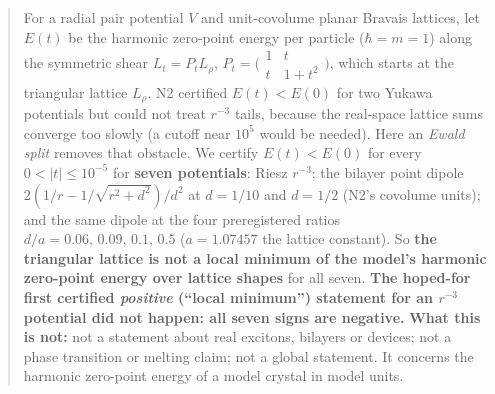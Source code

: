 \documentclass[11pt]{article}
\begin{document}
\begin{abstract}
For a radial pair potential $V$ and unit-covolume planar Bravais lattices, let $E(t)$ be the harmonic zero-point energy per particle ($\hbar=m=1$) along the symmetric shear
$L_t=P_tL_\rho$, $P_t=\bigl(\begin{smallmatrix}1&t\\t&1+t^2\end{smallmatrix}\bigr)$, which starts at the triangular lattice $L_\rho$.
N2 certified $E(t)<E(0)$ for two Yukawa potentials but could not treat $r^{-3}$ tails, because the real-space lattice sums converge too slowly (a cutoff near $10^5$ would be needed).
Here an \emph{Ewald split} removes that obstacle. We certify $E(t)<E(0)$ for every $0<|t|\le10^{-5}$ for \textbf{seven potentials}: Riesz $r^{-3}$; the bilayer point dipole
$2(1/r-1/\sqrt{r^2+d^2})/d^2$ at $d=1/10$ and $d=1/2$ (N2's covolume units); and the same dipole at the four preregistered ratios $d/a=0.06,\,0.09,\,0.1,\,0.5$ ($a=1.07457$ the lattice constant).
So \textbf{the triangular lattice is not a local minimum of the model's harmonic zero-point energy over lattice shapes} for all seven.
\textbf{The hoped-for first certified \emph{positive} (``local minimum'') statement for an $r^{-3}$ potential did not happen: all seven signs are negative.}
\textbf{What this is not:} not a statement about real excitons, bilayers or devices; not a phase transition or melting claim; not a global statement. It concerns the harmonic zero-point energy of a model crystal in model units.


\end{abstract}
\end{document}
